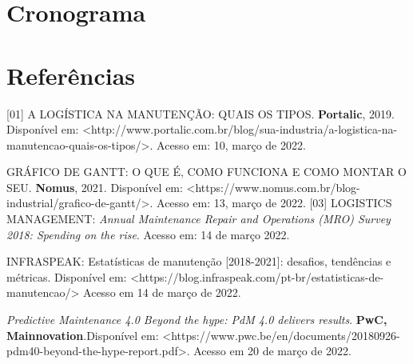 \documentclass[%
  a4paper,%
  12pt,%
  english,%
  brazilian,%
]{article}
\begin{document}

\section{Cronograma}%


\section{Referências}%
[01] A LOGÍSTICA NA MANUTENÇÃO: QUAIS OS TIPOS. \textbf{Portalic}, 2019. Disponível em: <http://www.portalic.com.br/blog/sua-industria/a-logistica-na-manutencao-quais-os-tipos/>. Acesso em: 10, março de 2022.\par
[02] GRÁFICO DE GANTT: O QUE É, COMO FUNCIONA E COMO MONTAR O SEU. \textbf{Nomus}, 2021. Disponível em: <https://www.nomus.com.br/blog-industrial/grafico-de-gantt/>. Acesso em: 13, março de 2022.
[03] LOGISTICS MANAGEMENT: \textit{Annual Maintenance Repair and Operations (MRO) Survey 2018: Spending on the rise}. Acesso em: 14 de março 2022.\par
[04] INFRASPEAK: Estatísticas de manutenção [2018-2021]: desafios, tendências e métricas. Disponível em: <https://blog.infraspeak.com/pt-br/estatisticas-de-manutencao/> Acesso em 14 de março de 2022.\par
[05]\textit{Predictive Maintenance 4.0 Beyond the hype: PdM 4.0 delivers results}. \textbf{PwC, Mainnovation}.Disponível em: <https://www.pwc.be/en/documents/20180926-pdm40-beyond-the-hype-report.pdf>. Acesso em 20 de março de 2022.

\end{document}
